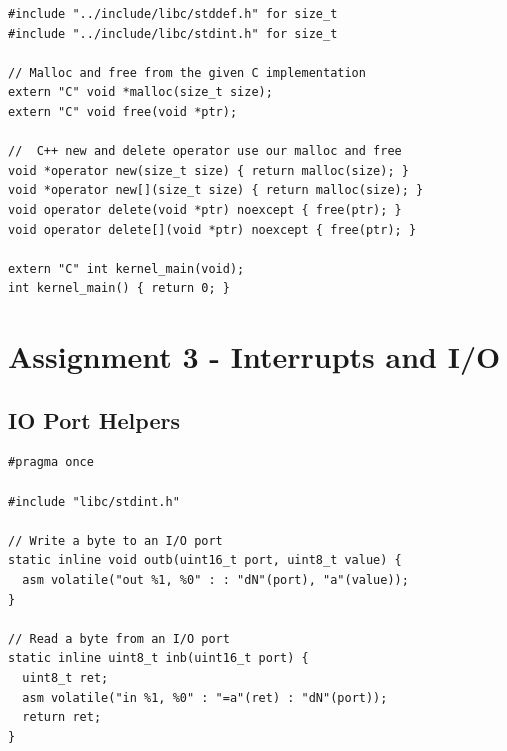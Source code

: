 \documentclass[../main.tex]{subfiles}
\begin{document}
\label{lst:kernel_cpp}
\begin{verbatim}
#include "../include/libc/stddef.h" for size_t
#include "../include/libc/stdint.h" for size_t

// Malloc and free from the given C implementation
extern "C" void *malloc(size_t size);
extern "C" void free(void *ptr);

//  C++ new and delete operator use our malloc and free
void *operator new(size_t size) { return malloc(size); }
void *operator new[](size_t size) { return malloc(size); }
void operator delete(void *ptr) noexcept { free(ptr); }
void operator delete[](void *ptr) noexcept { free(ptr); }

extern "C" int kernel_main(void);
int kernel_main() { return 0; }

\end{verbatim}


\section{Assignment 3 - Interrupts and I/O}
\label{apx:assignment_3___interrupts_and_i_o}


\subsection{IO Port Helpers}
\label{apx:io_port_helpers}


\label{lst:io_h}
\begin{verbatim}
#pragma once

#include "libc/stdint.h"

// Write a byte to an I/O port
static inline void outb(uint16_t port, uint8_t value) {
  asm volatile("out %1, %0" : : "dN"(port), "a"(value));
}

// Read a byte from an I/O port
static inline uint8_t inb(uint16_t port) {
  uint8_t ret;
  asm volatile("in %1, %0" : "=a"(ret) : "dN"(port));
  return ret;
}

\end{verbatim}
\end{document}
